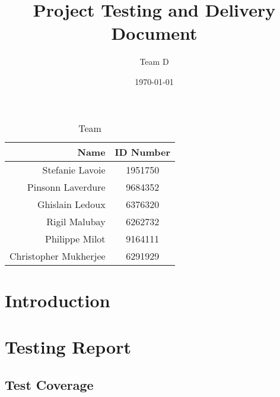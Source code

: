 \documentclass{article}
\begin{document}
\title{Project Testing and Delivery Document}
\author{Team D}
\date{\today}

\maketitle

\vspace*{3.5in}
\begin{table}[htbp]
\caption{Team}
\begin{center}
\begin{tabular}{|r | c|}
\hline
Name & ID Number \\
\hline\hline
Stefanie Lavoie & 1951750 \\
Pinsonn Laverdure & 9684352 \\
Ghislain Ledoux & 6376320 \\
Rigil Malubay & 6262732 \\
Philippe Milot & 9164111 \\
Christopher Mukherjee & 6291929 \\
\hline
\end{tabular}
\end{center}
\end{table}

\clearpage

\tableofcontents
\clearpage


\section{Introduction}


\section{Testing Report}


\subsection{Test Coverage}
\end{document}
